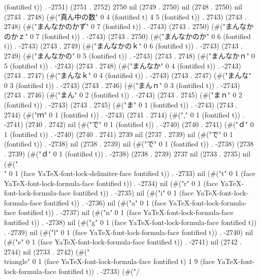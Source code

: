 (fontified t)) . -2751) (2751 . 2752) 2750 nil (2749 . 2750) nil (2748 . 2750) nil (2743 . 2748) (#("真ん中の数" 0 4 (fontified t) 4 5 (fontified t)) . 2743) (2743 . 2748) (#("まんなかのかず" 0 7 (fontified t)) . -2743) (2743 . 2750) (#("まんなかのかｚ" 0 7 (fontified t)) . -2743) (2743 . 2750) (#("まんなかのか" 0 6 (fontified t)) . -2743) (2743 . 2749) (#("まんなかのｋ" 0 6 (fontified t)) . -2743) (2743 . 2749) (#("まんなかの" 0 5 (fontified t)) . -2743) (2743 . 2748) (#("まんなかｎ" 0 5 (fontified t)) . -2743) (2743 . 2748) (#("まんなか" 0 4 (fontified t)) . -2743) (2743 . 2747) (#("まんなｋ" 0 4 (fontified t)) . -2743) (2743 . 2747) (#("まんな" 0 3 (fontified t)) . -2743) (2743 . 2746) (#("まんｎ" 0 3 (fontified t)) . -2743) (2743 . 2746) (#("まん" 0 2 (fontified t)) . -2743) (2743 . 2745) (#("まｎ" 0 2 (fontified t)) . -2743) (2743 . 2745) (#("ま" 0 1 (fontified t)) . -2743) (2743 . 2744) (#("ｍ" 0 1 (fontified t)) . -2743) (2741 . 2744) (#("," 0 1 (fontified t)) . -2741) (2740 . 2742) nil (#("で" 0 1 (fontified t)) . -2740) (2740 . 2741) (#("ｄ" 0 1 (fontified t)) . -2740) (2740 . 2741) 2739 nil (2737 . 2739) nil (#("で" 0 1 (fontified t)) . -2738) nil (2738 . 2739) nil (#("で" 0 1 (fontified t)) . -2738) (2738 . 2739) (#("ｄ" 0 1 (fontified t)) . -2738) (2738 . 2739) 2737 nil (2733 . 2735) nil (#("\\" 0 1 (face YaTeX-font-lock-delimiter-face fontified t)) . -2733) nil (#("t" 0 1 (face YaTeX-font-lock-formula-face fontified t)) . -2734) nil (#("r" 0 1 (face YaTeX-font-lock-formula-face fontified t)) . -2735) nil (#("i" 0 1 (face YaTeX-font-lock-formula-face fontified t)) . -2736) nil (#("a" 0 1 (face YaTeX-font-lock-formula-face fontified t)) . -2737) nil (#("n" 0 1 (face YaTeX-font-lock-formula-face fontified t)) . -2738) nil (#("g" 0 1 (face YaTeX-font-lock-formula-face fontified t)) . -2739) nil (#("l" 0 1 (face YaTeX-font-lock-formula-face fontified t)) . -2740) nil (#("e" 0 1 (face YaTeX-font-lock-formula-face fontified t)) . -2741) nil (2742 . 2744) nil (2733 . 2742) (#("\\triangle" 0 1 (face YaTeX-font-lock-formula-face fontified t) 1 9 (face YaTeX-font-lock-formula-face fontified t)) . -2733) (#("/\\
~~
